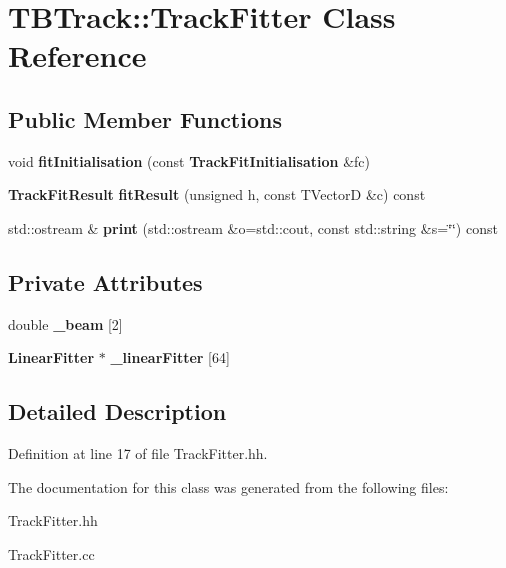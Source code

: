 \section{T\-B\-Track\-:\-:Track\-Fitter Class Reference}
\label{classTBTrack_1_1TrackFitter}
\subsection*{Public Member Functions}
\begin{DoxyCompactItemize}
\item 
void {\bfseries fit\-Initialisation} (const {\bf Track\-Fit\-Initialisation} \&fc)\label{classTBTrack_1_1TrackFitter_a2460810173c203d8a9dab70f3481a48b}

\item 
{\bf Track\-Fit\-Result} {\bfseries fit\-Result} (unsigned h, const T\-Vector\-D \&c) const \label{classTBTrack_1_1TrackFitter_a1ecf97b17f92a8e151d751952a8a4077}

\item 
std\-::ostream \& {\bfseries print} (std\-::ostream \&o=std\-::cout, const std\-::string \&s=\char`\"{}\char`\"{}) const \label{classTBTrack_1_1TrackFitter_a8e2e95aaccd987917e16a9475e3ec37d}

\end{DoxyCompactItemize}
\subsection*{Private Attributes}
\begin{DoxyCompactItemize}
\item 
double {\bfseries \-\_\-beam} [2]\label{classTBTrack_1_1TrackFitter_a7863eee7e5607686b64eed9de3acc7ce}

\item 
{\bf Linear\-Fitter} $\ast$ {\bfseries \-\_\-linear\-Fitter} [64]\label{classTBTrack_1_1TrackFitter_a315a4d5931c5e1d1aea888f7d2b0679b}

\end{DoxyCompactItemize}


\subsection{Detailed Description}


Definition at line 17 of file Track\-Fitter.\-hh.



The documentation for this class was generated from the following files\-:\begin{DoxyCompactItemize}
\item 
Track\-Fitter.\-hh\item 
Track\-Fitter.\-cc\end{DoxyCompactItemize}
